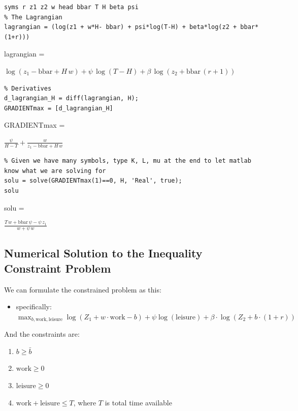 \documentclass[
]{book}
\providecommand{\tightlist}{%
  \setlength{\itemsep}{0pt}\setlength{\parskip}{0pt}}
\begin{document}
\begin{verbatim}
syms r z1 z2 w head bbar T H beta psi
% The Lagrangian
lagrangian = (log(z1 + w*H- bbar) + psi*log(T-H) + beta*log(z2 + bbar*(1+r)))
\end{verbatim}

lagrangian =

\(\displaystyle \log \left(z_1 -\textrm{bbar}+H\,w\right)+\psi \,\log \left(T-H\right)+\beta \,\log \left(z_2 +\textrm{bbar}\,{\left(r+1\right)}\right)\)

\begin{verbatim}
% Derivatives
d_lagrangian_H = diff(lagrangian, H);
GRADIENTmax = [d_lagrangian_H]
\end{verbatim}

GRADIENTmax =

\(\displaystyle \frac{\psi }{H-T}+\frac{w}{z_1 -\textrm{bbar}+H\,w}\)

\begin{verbatim}
% Given we have many symbols, type K, L, mu at the end to let matlab know what we are solving for
solu = solve(GRADIENTmax(1)==0, H, 'Real', true);
solu
\end{verbatim}

solu =

\(\displaystyle \frac{T\,w+\textrm{bbar}\,\psi -\psi \,z_1 }{w+\psi \,w}\)

\hypertarget{numerical-solution-to-the-inequality-constraint-problem}{%
\subsection{Numerical Solution to the Inequality Constraint Problem}\label{numerical-solution-to-the-inequality-constraint-problem}}

We can formulate the constrained problem as this:

\begin{itemize}
\tightlist
\item
  specifically:
  \(\max_{b,\textrm{work},\textrm{leisure}} \log (Z_1 +w\cdot \textrm{work}-b)+\psi \log (\textrm{leisure})+\beta \cdot \log (Z_2 +b\cdot (1+r))\)
\end{itemize}

And the constraints are:

\begin{enumerate}
\def\labelenumi{\arabic{enumi}.}
\item
  \(\displaystyle b\ge \bar{b}\)
\item
  \(\displaystyle \textrm{work}\ge 0\)
\item
  \(\displaystyle \textrm{leisure}\ge 0\)
\item
  \(\textrm{work}+\textrm{leisure}\le T\), where \(T\) is total time
  available
\end{enumerate}
\end{document}
